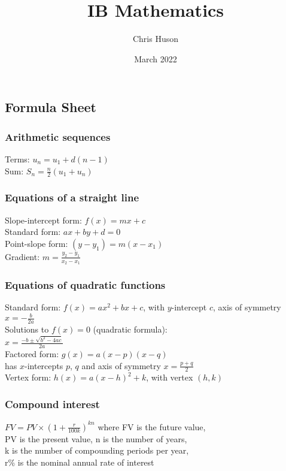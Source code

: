 \documentclass[12pt, twoside]{article}
\title{IB Mathematics}
\author{Chris Huson}
\date{March 2022}
\begin{document}
\subsection*{Formula Sheet}

\subsubsection*{Arithmetic sequences}
Terms: $u_n=u_1 + d(n-1)$\\[0.25cm]
Sum: $\displaystyle S_n= \frac{n}{2}(u_1 + u_n)$

\subsubsection*{Equations of a straight line} 
Slope-intercept form: $f(x)=mx+c$\\[0.25cm]
Standard form: $ax+by+d=0$\\[0.25cm]
Point-slope form: $(y-y_1)=m(x-x_1)$\\[0.25cm]
Gradient: $\displaystyle m=\frac{y_2-y_1}{x_2-x_1}$

\subsubsection*{Equations of quadratic functions}
Standard form: $f(x)=ax^2 + bx+c$, with $y$-intercept $c$, axis of symmetry $\displaystyle x=-\frac{b}{2a}$\\[0.25cm]
Solutions to $f(x)=0$ (quadratic formula): \\[0.25cm]
$\displaystyle x=\frac{-b \pm \sqrt{b^2-4ac}}{2a}$\\[0.25cm]
Factored form: $g(x)=a(x-p)(x-q)$ \\[0.25cm]
has $x$-intercepts $p$, $q$ and axis of symmetry $\displaystyle x=\frac{p+q}{2}$\\[0.25cm] 
Vertex form: $h(x)=a(x-h)^2+k$, with vertex $(h,k)$

\subsubsection*{Compound interest}
$\displaystyle FV=PV \times \left(1+\frac{r}{100k} \right)^{kn}$
where FV is the future value,\\[0.25cm]
PV is the present value, n is the number of years, \\[0.25cm]
 k is the number of compounding periods per year, \\[0.25cm]
 r\% is the nominal annual rate of interest


\end{document}
